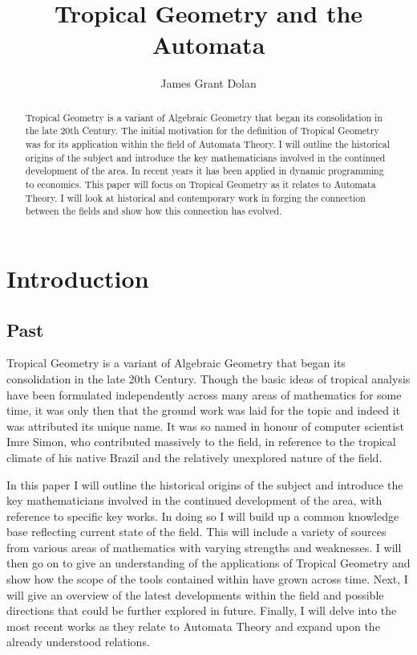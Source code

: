 \documentclass[12pt,a4paper]{amsart}
\theoremstyle{definition}
\theoremstyle{remark}
\begin{document}
%
%
\title{Tropical Geometry and the Automata}
\author{James Grant Dolan}
\begin{abstract}
Tropical Geometry is a variant of Algebraic Geometry that began its consolidation in the late 20th Century. The initial motivation for the definition of Tropical Geometry was for its application within the field of Automata Theory. I will outline the historical origins of the subject and introduce the key mathematicians involved in the continued development of the area. In recent years it has been applied in dynamic programming to economics. This paper will focus on Tropical Geometry as it relates to Automata Theory. I will look at historical and contemporary work in forging the connection between the fields and show how this connection has evolved.
\end{abstract}
\maketitle
%
%

%
%

\tableofcontents

\newpage
\section*{Introduction}

\subsection*{Past}
Tropical Geometry is a variant of Algebraic Geometry that began its consolidation in the late 20th Century.
Though the basic ideas of tropical analysis have been formulated independently across many areas of mathematics for some time, it was only then that the ground work was laid for the topic and indeed it was attributed its unique name.
It was so named in honour of computer scientist Imre Simon, who contributed massively to the field\cite{10.1007/BFb0017135}, in reference to the tropical climate of his native Brazil and the relatively unexplored nature of the field.

In this paper I will outline the historical origins of the subject and introduce the key mathematicians involved in the continued development of the area, with reference to specific key works.
In doing so I will build up a common knowledge base reflecting current state of the field.
This will include a variety of sources from various areas of mathematics with varying strengths and weaknesses.
I will then go on to give an understanding of the applications of Tropical Geometry and show how the scope of the tools contained within have grown across time.
Next, I will give an overview of the latest developments within the field and possible directions that could be further explored in future. 
Finally, I will delve into the most recent works as they relate to Automata Theory and expand upon the already understood relations.
\end{document}
